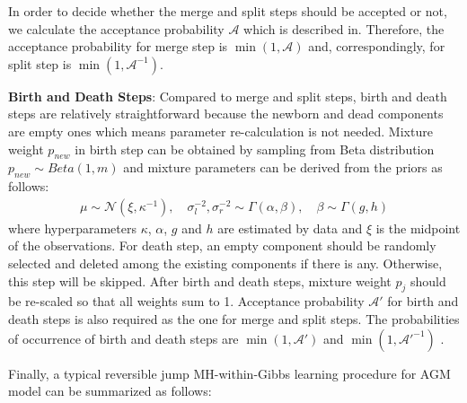 \documentclass[conference]{IEEEtran}
\begin{document}
In order to decide whether the merge and split steps should be accepted or not, we calculate the acceptance probability $\mathcal{A}$ which is described in\cite{Richardson1997}. Therefore, the acceptance probability for merge step is $\min(1,\mathcal{A})$ and, correspondingly, for split step is $\min(1,\mathcal{A}^{-1})$.

\textbf{Birth and Death Steps}: Compared to merge and split steps, birth and death steps are relatively straightforward because the newborn and dead components are empty ones which means parameter re-calculation is not needed. Mixture weight $p_{new}$ in birth step can be obtained by sampling from Beta distribution $p_{new} \sim Beta(1,m)$ and mixture parameters can be derived from the priors as follows\cite{Casella2004}:
\begin{align}
\mu \sim \mathcal{N}(\xi,\kappa^{-1}), \quad \sigma_{l}^{-2},\sigma_{r}^{-2} \sim \Gamma(\alpha,\beta), \quad \beta \sim \Gamma(g,h)
\label{eq:prior}
\end{align}
where hyperparameters $\kappa$, $\alpha$, $g$ and $h$ are estimated by data and $\xi$ is the midpoint of the observations. For death step, an empty component should be randomly selected and deleted among the existing components if there is any. Otherwise, this step will be skipped. After birth and death steps, mixture weight $p_j$ should be re-scaled so that all weights sum to 1. Acceptance probability $\mathcal{A}'$ for birth and death steps is also required as the one for merge and split steps. The probabilities of occurrence of birth and death steps are $\min(1,\mathcal{A}')$ and $\min(1,\mathcal{A}'^{-1})$ \cite{Richardson1997}.

Finally, a typical reversible jump MH-within-Gibbs learning procedure for AGM model can be summarized as follows:
\end{document}
